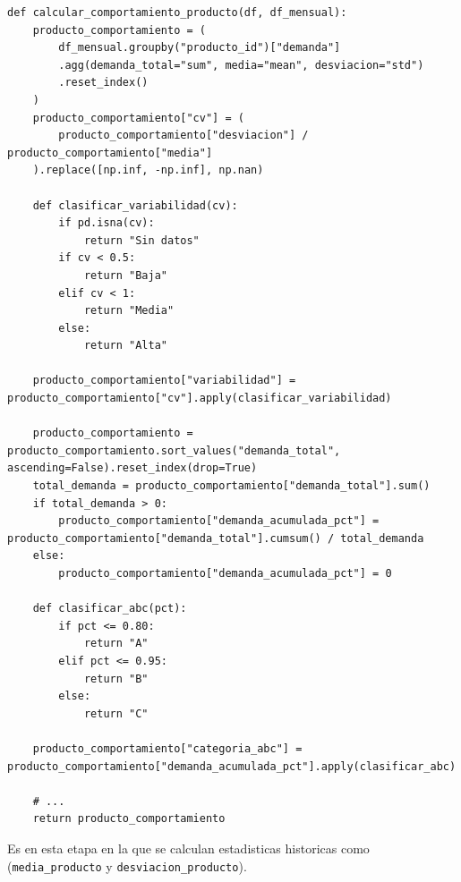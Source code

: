 \begin{verbatim}
def calcular_comportamiento_producto(df, df_mensual):
    producto_comportamiento = (
        df_mensual.groupby("producto_id")["demanda"]
        .agg(demanda_total="sum", media="mean", desviacion="std")
        .reset_index()
    )
    producto_comportamiento["cv"] = (
        producto_comportamiento["desviacion"] / producto_comportamiento["media"]
    ).replace([np.inf, -np.inf], np.nan)

    def clasificar_variabilidad(cv):
        if pd.isna(cv):
            return "Sin datos"
        if cv < 0.5:
            return "Baja"
        elif cv < 1:
            return "Media"
        else:
            return "Alta"

    producto_comportamiento["variabilidad"] = producto_comportamiento["cv"].apply(clasificar_variabilidad)

    producto_comportamiento = producto_comportamiento.sort_values("demanda_total", ascending=False).reset_index(drop=True)
    total_demanda = producto_comportamiento["demanda_total"].sum()
    if total_demanda > 0:
        producto_comportamiento["demanda_acumulada_pct"] = producto_comportamiento["demanda_total"].cumsum() / total_demanda
    else:
        producto_comportamiento["demanda_acumulada_pct"] = 0

    def clasificar_abc(pct):
        if pct <= 0.80:
            return "A"
        elif pct <= 0.95:
            return "B"
        else:
            return "C"

    producto_comportamiento["categoria_abc"] = producto_comportamiento["demanda_acumulada_pct"].apply(clasificar_abc)

    # ...
    return producto_comportamiento
\end{verbatim}

Es en esta etapa en la que se calculan estadisticas historicas como (\texttt{media\_producto} y \texttt{desviacion\_producto}).
